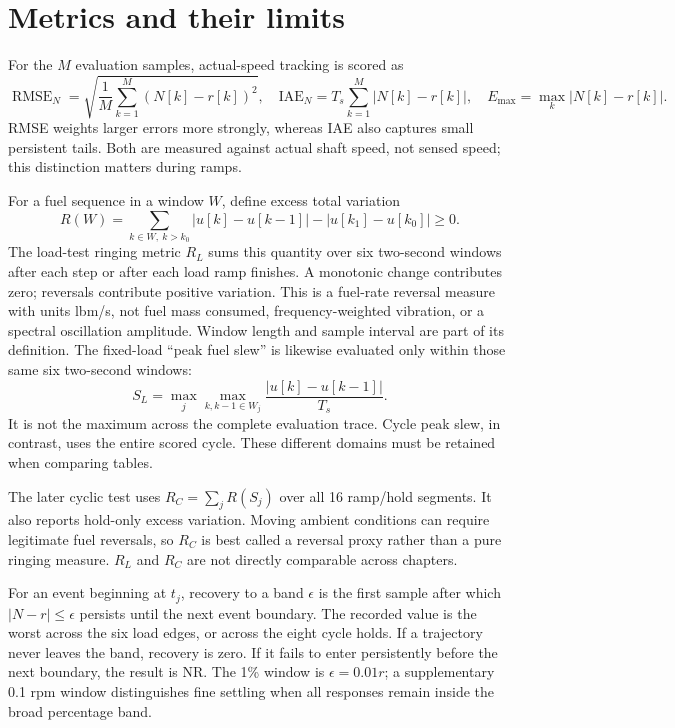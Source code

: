 \documentclass[11pt,a4paper,oneside]{report}
\newcommand{\RMSE}{\operatorname{RMSE}}
\begin{document}
\section{Metrics and their limits}
For the $M$ evaluation samples, actual-speed tracking is scored as
\begin{equation}
\RMSE_N=\sqrt{\frac1M\sum_{k=1}^M(N[k]-r[k])^2},\quad
\mathrm{IAE}_N=T_s\sum_{k=1}^M|N[k]-r[k]|,\quad
E_{\max}=\max_k|N[k]-r[k]|.
\end{equation}
RMSE weights larger errors more strongly, whereas IAE also captures small persistent tails. Both are measured against actual shaft speed, not sensed speed; this distinction matters during ramps.

For a fuel sequence in a window $W$, define excess total variation
\begin{equation}
R(W)=\sum_{k\in W,\ k>k_0}|u[k]-u[k-1]|-|u[k_1]-u[k_0]|\geq0.
\label{eq:ring}
\end{equation}
The load-test ringing metric $R_L$ sums this quantity over six two-second windows after each step or after each load ramp finishes. A monotonic change contributes zero; reversals contribute positive variation. This is a fuel-rate reversal measure with units lbm/s, not fuel mass consumed, frequency-weighted vibration, or a spectral oscillation amplitude. Window length and sample interval are part of its definition. The fixed-load ``peak fuel slew'' is likewise evaluated only within those same six two-second windows:
\begin{equation}
S_L=\max_j\max_{k,k-1\in W_j}\frac{|u[k]-u[k-1]|}{T_s}.
\end{equation}
It is not the maximum across the complete evaluation trace. Cycle peak slew, in contrast, uses the entire scored cycle. These different domains must be retained when comparing tables.

The later cyclic test uses $R_C=\sum_jR(S_j)$ over all 16 ramp/hold segments. It also reports hold-only excess variation. Moving ambient conditions can require legitimate fuel reversals, so $R_C$ is best called a reversal proxy rather than a pure ringing measure. $R_L$ and $R_C$ are not directly comparable across chapters.

For an event beginning at $t_j$, recovery to a band $\epsilon$ is the first sample after which $|N-r|\leq\epsilon$ persists until the next event boundary. The recorded value is the worst across the six load edges, or across the eight cycle holds. If a trajectory never leaves the band, recovery is zero. If it fails to enter persistently before the next boundary, the result is NR. The 1\% window is $\epsilon=0.01r$; a supplementary 0.1 rpm window distinguishes fine settling when all responses remain inside the broad percentage band.
\end{document}
